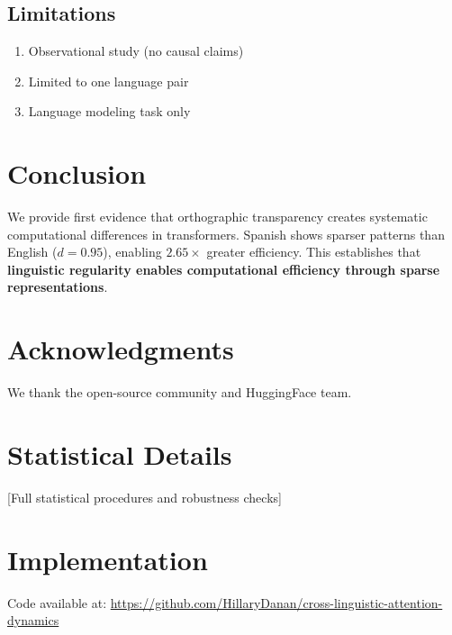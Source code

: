 \documentclass[11pt,a4paper]{article}
\begin{document}
\subsection{Limitations}

\begin{enumerate}
    \item Observational study (no causal claims)
    \item Limited to one language pair
    \item Language modeling task only
\end{enumerate}

\section{Conclusion}

We provide first evidence that orthographic transparency creates systematic computational differences in transformers. Spanish shows sparser patterns than English ($d = 0.95$), enabling $2.65\times$ greater efficiency. This establishes that \textbf{linguistic regularity enables computational efficiency through sparse representations}.

\section*{Acknowledgments}

We thank the open-source community and HuggingFace team.




\appendix

\section{Statistical Details}
[Full statistical procedures and robustness checks]

\section{Implementation}
Code available at: \url{https://github.com/HillaryDanan/cross-linguistic-attention-dynamics}
\end{document}
